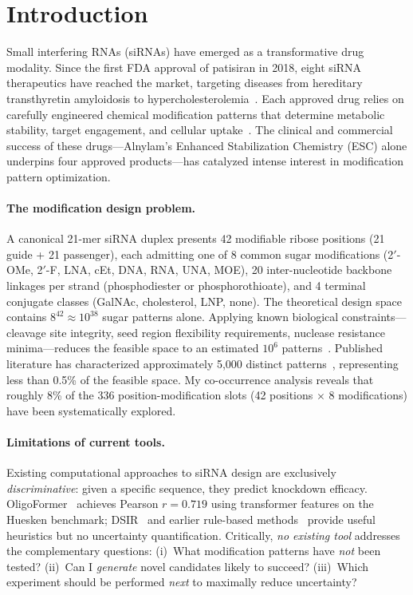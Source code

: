 \documentclass{article}
\begin{document}

\section{Introduction}

Small interfering RNAs (siRNAs) have emerged as a transformative drug modality. Since the first FDA approval of patisiran in 2018, eight siRNA therapeutics have reached the market, targeting diseases from hereditary transthyretin amyloidosis to hypercholesterolemia~\citep{setten2019}. Each approved drug relies on carefully engineered chemical modification patterns that determine metabolic stability, target engagement, and cellular uptake~\citep{foster2018}. The clinical and commercial success of these drugs---Alnylam's Enhanced Stabilization Chemistry (ESC) alone underpins four approved products---has catalyzed intense interest in modification pattern optimization.

\paragraph{The modification design problem.}
A canonical 21-mer siRNA duplex presents 42 modifiable ribose positions (21 guide + 21 passenger), each admitting one of 8 common sugar modifications (2$'$-OMe, 2$'$-F, LNA, cEt, DNA, RNA, UNA, MOE), 20 inter-nucleotide backbone linkages per strand (phosphodiester or phosphorothioate), and 4 terminal conjugate classes (GalNAc, cholesterol, LNP, none). The theoretical design space contains $8^{42} \approx 10^{38}$ sugar patterns alone. Applying known biological constraints---cleavage site integrity, seed region flexibility requirements, nuclease resistance minima---reduces the feasible space to an estimated $10^{6}$ patterns~\citep{oreilly2025}. Published literature has characterized approximately 5,000 distinct patterns~\citep{dar2016, huesken2005, takahashi2009}, representing less than 0.5\% of the feasible space. My co-occurrence analysis reveals that roughly 8\% of the 336 position-modification slots (42 positions $\times$ 8 modifications) have been systematically explored.

\paragraph{Limitations of current tools.}
Existing computational approaches to siRNA design are exclusively \emph{discriminative}: given a specific sequence, they predict knockdown efficacy. OligoFormer~\citep{oligoformer2024} achieves Pearson $r=0.719$ using transformer features on the Huesken benchmark; DSIR~\citep{dsir2004} and earlier rule-based methods~\citep{reynolds2004, uitei2004} provide useful heuristics but no uncertainty quantification. Critically, \emph{no existing tool} addresses the complementary questions: (i)~What modification patterns have \emph{not} been tested? (ii)~Can I \emph{generate} novel candidates likely to succeed? (iii)~Which experiment should be performed \emph{next} to maximally reduce uncertainty?
\end{document}
